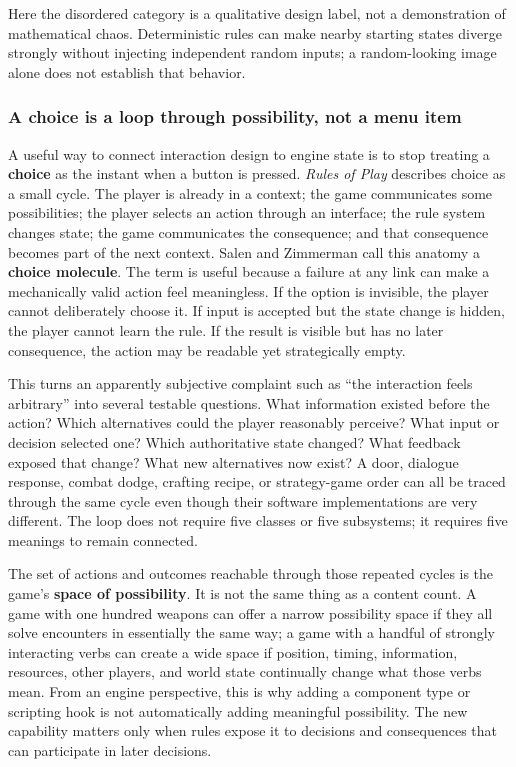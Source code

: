 Here the disordered category is a qualitative design label, not a demonstration of mathematical chaos. Deterministic rules can make nearby starting states diverge strongly without injecting independent random inputs; a random-looking image alone does not establish that behavior.

\subsubsection{A choice is a loop through possibility, not a menu item}\label{05-engine-i-ch009-a-choice-is-a-loop-through-possibility-not-a-menu-item}

A useful way to connect interaction design to engine state is to stop treating a \textbf{choice} as the instant when a button is pressed. \emph{Rules of Play} describes choice as a small cycle. The player is already in a context; the game communicates some possibilities; the player selects an action through an interface; the rule system changes state; the game communicates the consequence; and that consequence becomes part of the next context. Salen and Zimmerman call this anatomy a \textbf{choice molecule}. The term is useful because a failure at any link can make a mechanically valid action feel meaningless. If the option is invisible, the player cannot deliberately choose it. If input is accepted but the state change is hidden, the player cannot learn the rule. If the result is visible but has no later consequence, the action may be readable yet strategically empty.

This turns an apparently subjective complaint such as ``the interaction feels arbitrary'' into several testable questions. What information existed before the action? Which alternatives could the player reasonably perceive? What input or decision selected one? Which authoritative state changed? What feedback exposed that change? What new alternatives now exist? A door, dialogue response, combat dodge, crafting recipe, or strategy-game order can all be traced through the same cycle even though their software implementations are very different. The loop does not require five classes or five subsystems; it requires five meanings to remain connected.

The set of actions and outcomes reachable through those repeated cycles is the game's \textbf{space of possibility}. It is not the same thing as a content count. A game with one hundred weapons can offer a narrow possibility space if they all solve encounters in essentially the same way; a game with a handful of strongly interacting verbs can create a wide space if position, timing, information, resources, other players, and world state continually change what those verbs mean. From an engine perspective, this is why adding a component type or scripting hook is not automatically adding meaningful possibility. The new capability matters only when rules expose it to decisions and consequences that can participate in later decisions.

